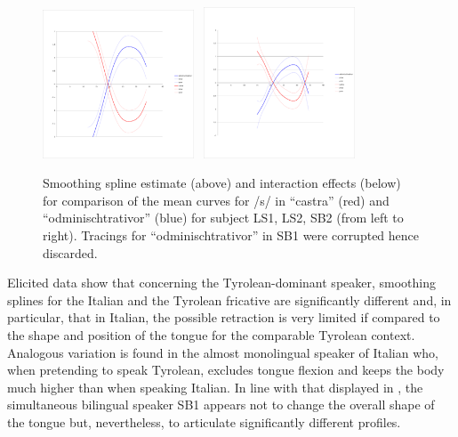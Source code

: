 \documentclass[output=paper]{LSP/langsci}
\begin{document}
\begin{figure}
\includegraphics[width=0.4\textwidth]{illustrations/sprea_fig5e}~
\includegraphics[width=0.4\textwidth]{illustrations/sprea_fig5f}\\
\label{fig:5}   
\caption{Smoothing spline estimate (above) and interaction effects (below) for comparison of the mean curves for /s/ in “castra” (red) and “odminischtrativor” (blue) for subject LS1, LS2, SB2 (from left to right). Tracings for “odminischtrativor” in SB1 were corrupted hence discarded.}
\end{figure}

Elicited data show that concerning the Tyrolean-dominant speaker, smoothing splines for the Italian and the Tyrolean fricative are significantly different and, in particular, that in Italian, the possible retraction is very limited if compared to the shape and position of the tongue for the comparable Tyrolean context. Analogous variation is found in the almost monolingual speaker of Italian who, when pretending to speak Tyrolean, excludes tongue flexion and keeps the body much higher than when speaking Italian. In line with that displayed in , the simultaneous bilingual speaker SB1 appears not to change the overall shape of the tongue but, nevertheless, to articulate significantly different profiles.
\end{document}
